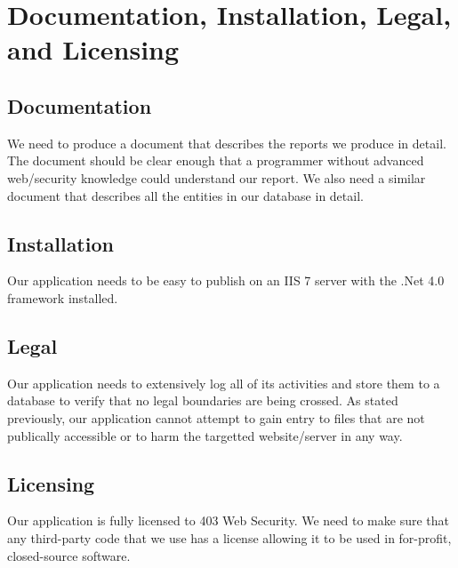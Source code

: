 \section{Documentation, Installation, Legal, and Licensing}
\subsection{Documentation}
We need to produce a document that describes the reports we produce in detail. The document should be clear enough that a programmer without advanced web/security knowledge could understand our report. We also need a similar document that describes all the entities in our database in detail. 
\subsection{Installation}
Our application needs to be easy to publish on an IIS 7 server with the .Net 4.0 framework installed.
\subsection{Legal}
Our application needs to extensively log all of its activities and store them to a database to verify that no legal boundaries are being crossed. As stated previously, our application cannot attempt to gain entry to files that are not publically accessible or to harm the targetted website/server in any way.
\subsection{Licensing}
Our application is fully licensed to 403 Web Security. We need to make sure that any third-party code that we use has a license allowing it to be used in for-profit, closed-source software.
